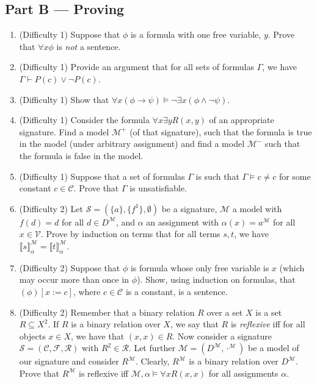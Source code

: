 \subsection{Part B --- Proving}
	
\begin{enumerate}[\thesubsection.1]
  
\item (Difficulty 1) Suppose that $\phi$ is a formula with one free
  variable, $y$. Prove that $\forall x\phi$ is \emph{not} a sentence.
  
\item (Difficulty 1) Provide an argument that for all sets of formulas $\Gamma$,
      we have $\Gamma\vdash P(c)\lor\neg P(c)$.

\item (Difficulty 1) Show that $\forall x(\phi\to \psi)\vDash \neg
  \exists x(\phi\land\neg\psi)$.

  \item (Difficulty 1) Consider the formula $\forall x\exists yR(x,y)$ of an
    appropriate signature. Find a model $\mathcal{M}^+$ (of that
    signature), such that the formula is true in the model (under
    arbitrary assignment) and find a model $\mathcal{M}^-$ such that
    the formula is false in the model.

\item (Difficulty 1) Suppose that a set of formulas $\Gamma$ is
            such that $\Gamma\vDash c\neq c$ for some constant
            $c\in\mathcal{C}$. Prove that $\Gamma$ is unsatisfiable.

\item (Difficulty 2) Let $\mathcal{S}=(\{a\}, \{f^1\},\emptyset)$ be a
  signature, $\mathcal{M}$ a model with $f(d)=d$ for all $d\in
  D^\mathcal{M}$, and $\alpha$ an assignment with
  $\alpha(x)=a^\mathcal{M}$ for all $x\in \mathcal{V}$. Prove by
  induction on terms that for all terms $s,t$, we have $\llbracket s\rrbracket^\mathcal{M}_\alpha=\llbracket t\rrbracket^\mathcal{M}_\alpha$.

\item (Difficulty 2) Suppose that $\phi$ is formula whose only free variable
          is $x$ (which may occur more than once in $\phi$). Show,
          using induction on formulas, that
          $(\phi)[x:=c]$, where $c\in\mathcal{C}$ is a
          constant, is a sentence.

  \item (Difficulty 2) Remember that a binary relation $R$ over a set $X$ is a set
  $R\subseteq X^2$. If $R$ is a binary relation over $X$, we say that $R$ is
  \emph{reflexive} iff for all objects $x\in X$, we have that
  $(x,x)\in R$. Now consider a signature $\mathcal{S}=(\mathcal{C},\mathcal{F},
  \mathcal{R})$ with $R^2\in\mathcal{R}$. Let further
  $\mathcal{M}=(D^\mathcal{M}, \cdot^\mathcal{M})$ be
  a model of our signature and consider $R^\mathcal{M}$. Clearly,
  $R^\mathcal{M}$ is a binary relation over $D^\mathcal{M}$. Prove
  that $R^\mathcal{M}$ is reflexive iff $\mathcal{M},\alpha\vDash
  \forall xR(x,x)$ for all assignments $\alpha$.


\end{enumerate}
